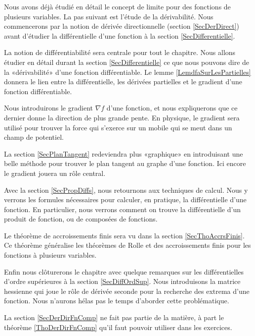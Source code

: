 Nous avons déjà étudié en détail le concept de limite pour des fonctions de plusieurs variables. La pas suivant est l'étude de la dérivabilité. Nous commencerons par la notion de dérivée directionnelle (section \ref{SecDerDirect}) avant d'étudier la différentielle d'une fonction à la section \ref{SecDifferentielle}. 

La notion de différentiabilité sera centrale pour tout le chapitre. Nous allons étudier en détail durant la section \ref{SecDifferentielle} ce que nous pouvons dire de la «dérivabilité» d'une fonction différentiable. Le lemme \ref{LemdfaSurLesPartielles} donnera le lien entre la différentielle, les dérivées partielles et le gradient d'une fonction différentiable.

Nous introduirons le gradient $\nabla f$ d'une fonction, et nous expliquerons que ce dernier donne la direction de plus grande pente. En physique, le gradient sera utilisé pour trouver la force qui s'exerce sur un mobile qui se meut dans un champ de potentiel.

La section \ref{SecPlanTangent} redeviendra plus «graphique» en introduisant une belle méthode pour trouver le plan tangent au graphe d'une fonction. Ici encore le gradient jouera un rôle central.

Avec la section \ref{SecPropDiffs}, nous retournons aux techniques de calcul. Nous y verrons les formules nécessaires pour calculer, en pratique, la différentielle d'une fonction. En particulier, nous verrons comment on trouve la différentielle d'un produit de fonction, ou de composées de fonctions.

Le théorème de accroissements finis sera vu dans la section \ref{SecThoAccrsFinis}. Ce théorème généralise les théorèmes de Rolle et des accroissements finis pour les fonctions à plusieurs variables.

Enfin nous clôturerons le chapitre avec quelque remarques sur les différentielles d'ordre supérieures à la section \ref{SecDiffOrdSup}. Nous introduisons la matrice hessienne qui joue le rôle de dérivée seconde pour la recherche des extrema d'une fonction. Nous n'aurons hélas pas le temps d'aborder cette problématique.

La section \ref{SecDerDirFnComp} ne fait pas partie de la matière, à part le théorème \ref{ThoDerDirFnComp} qu'il faut pouvoir utiliser dans les exercices.

